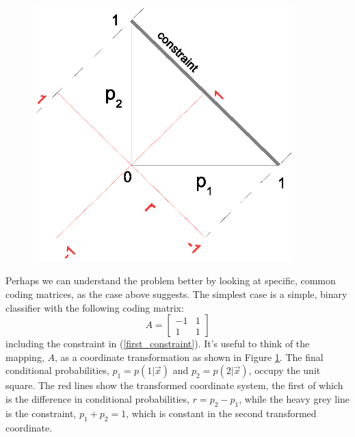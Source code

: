 \documentclass{article}
\begin{document}
\begin{figure}
\includegraphics[width=0.9\textwidth]{binary_class_map}
\label{transform}
\end{figure}

Perhaps we can understand the problem better by looking at specific, common 
coding matrices, as the case above suggests.  
The simplest case is a simple, binary classifier with the following 
coding matrix:
\begin{equation}
A = \begin{bmatrix}
-1 & 1 \\
1 & 1
\end{bmatrix}
\end{equation}
including the constraint in (\ref{first_constraint}).  It's useful to think
of the mapping, $A$, as a coordinate transformation as shown in Figure
\ref{transform}.  The final conditional probabilities, $p_1=p(1|\vec x)$ and
$p_2=p(2|\vec x)$, occupy the unit square.  The red lines show the transformed
coordinate system, the first of which is the difference in conditional
probabilities, $r=p_2 - p_1$,
while the heavy grey line is the constraint, $p_1+p_2=1$,
which is constant in the second transformed coordinate.
\end{document}
